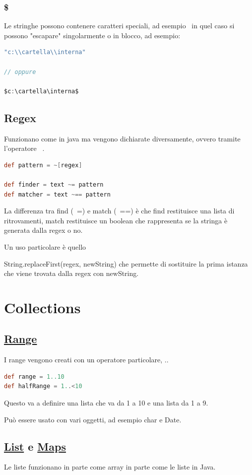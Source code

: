 \documentclass[11pt,a4paper]{book}
\begin{document}
\subsection{\$}
Le stringhe possono contenere caratteri speciali, ad esempio \, in quel caso si possono "escapare" singolarmente o in blocco, ad esempio:
\begin{lstlisting}[language = groovy]
"c:\\cartella\\interna"

// oppure

$c:\cartella\interna$
\end{lstlisting}

\section{Regex}
Funzionano come in java ma vengono dichiarate diversamente, ovvero tramite l'operatore ~.
\begin{lstlisting}[language = groovy]
def pattern = ~[regex]

def finder = text ~= pattern
def matcher = text ~== pattern
\end{lstlisting}
La differenza tra find (~=) e match (~==) è che find restituisce una lista di ritrovamenti, match restituisce un boolean che rappresenta se la stringa è generata dalla regex o no.

Un uso particolare è quello

String.replaceFirst(regex, newString) che permette di sostituire la prima istanza che viene trovata dalla regex con newString.

\chapter{Collections}
\section{\href{http://docs.groovy-lang.org/latest/html/gapi/groovy/lang/Range.html}{Range}}
I range vengono creati con un operatore particolare, ..
\begin{lstlisting}[language = groovy]
def range = 1..10
def halfRange = 1..<10
\end{lstlisting}
Questo va a definire una lista che va da 1 a 10 e una lista da 1 a 9.

Può essere usato con vari oggetti, ad esempio char e Date.

\section{\href{http://docs.groovy-lang.org/latest/html/groovy-jdk/java/util/List.html}{List} e \href{http://docs.groovy-lang.org/latest/html/groovy-jdk/java/util/Map.html}{Maps}}
Le liste funzionano in parte come array in parte come le liste in Java.
\end{document}
